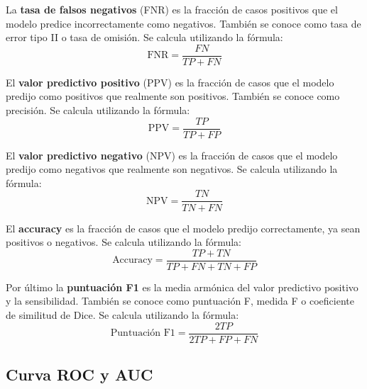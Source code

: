 La \textbf{tasa de falsos negativos} (FNR) es la fracción de casos positivos que el modelo predice incorrectamente como negativos. También se conoce como tasa de error tipo II o tasa de omisión. Se calcula utilizando la fórmula:
\[
\text{FNR} = \frac{FN}{TP + FN}
\]

El \textbf{valor predictivo positivo} (PPV) es la fracción de casos que el modelo predijo como positivos que realmente son positivos. También se conoce como precisión. Se calcula utilizando la fórmula:
\[
\text{PPV} = \frac{TP}{TP + FP}
\]

El \textbf{valor predictivo negativo} (NPV) es la fracción de casos que el modelo predijo como negativos que realmente son negativos. Se calcula utilizando la fórmula:
\[
\text{NPV} = \frac{TN}{TN + FN}
\]

El \textbf{accuracy} es la fracción de casos que el modelo predijo correctamente, ya sean positivos o negativos. Se calcula utilizando la fórmula:
\[
\text{Accuracy} = \frac{TP + TN}{TP + FN + TN + FP}
\]

Por último la \textbf{puntuación F1} es la media armónica del valor predictivo positivo y la sensibilidad. También se conoce como puntuación F, medida F o coeficiente de similitud de Dice. Se calcula utilizando la fórmula:
\[
\text{Puntuación F1} = \frac{2TP}{2TP + FP + FN}
\]



\subsection{Curva ROC y AUC}

